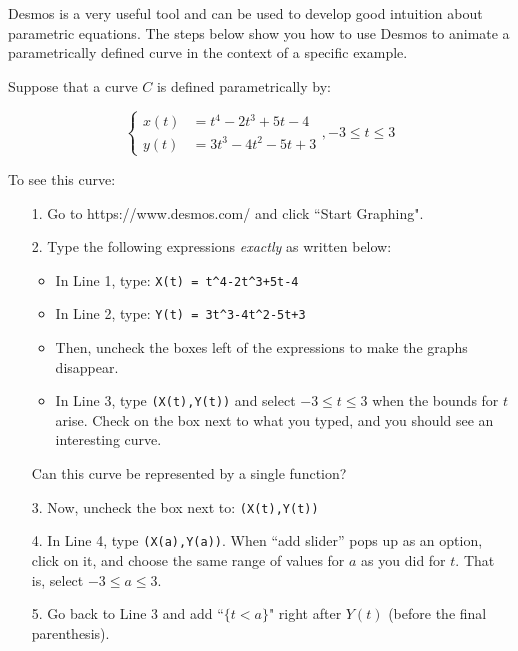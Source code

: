 \documentclass{ximera}
\author{Jim Talamo}
\begin{document}
\begin{exercise}
Desmos is a very useful tool and can be used to develop good intuition about parametric equations.  The steps below show you how to use Desmos to animate a parametrically defined curve in the context of a specific example.

Suppose that a curve $C$ is defined parametrically by:

\[
\begin{cases}
x(t)&=  t^4-2t^3+5t-4\\
y(t)&=  3t^3-4t^2-5t+3
\end{cases} 
, -3 \leq t \leq 3
\]

To see this curve:

\begin{itemize}
\item[1.] Go to https://www.desmos.com/ and click ``Start Graphing".
\item[2.] Type the following expressions \emph{exactly} as written below:
\begin{itemize}
\item In Line 1, type: \verb|X(t) = t^4-2t^3+5t-4|  
\item In Line 2, type: \verb|Y(t) = 3t^3-4t^2-5t+3|
\item Then, uncheck the boxes left of the expressions to make the graphs disappear.
\item In Line 3, type \verb|(X(t),Y(t))| and select $-3\leq t \leq3$ when the bounds for $t$ arise.  Check on the box next to what you typed, and you should see an interesting curve.
\end{itemize}
Can this curve be represented by a single function?

\begin{multipleChoice}
\end{multipleChoice}

\item[3.] Now, uncheck the box next to: \verb|(X(t),Y(t))|
\item[4.] In Line 4, type \verb|(X(a),Y(a))|.  When ``add slider'' pops up as an option, click on it, and choose the same range of values for $a$ as you did for $t$.  That is, select $-3 \leq a \leq 3$.
\item[5.] Go back to Line 3 and add ``$\{t<a\}$" right after $Y(t)$ (before the final parenthesis).  


\end{itemize}
\end{exercise}
\end{document}
